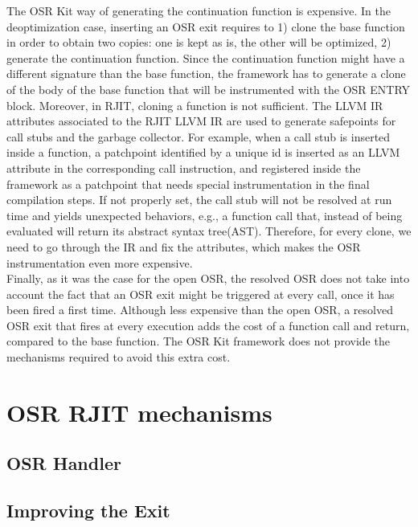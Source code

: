 The OSR Kit way of generating the continuation function is expensive.
In the deoptimization case, inserting an OSR exit requires to 1) clone the base function in order to obtain two copies: one is kept as is, the other will be optimized, 2) generate the continuation function. 
Since the continuation function might have a different signature than the base function, the framework has to generate a clone of the body of the base function that will be instrumented with the OSR ENTRY block.
Moreover, in RJIT, cloning a function is not sufficient.
The LLVM IR attributes\cite{llvmAttribute} associated to the RJIT LLVM IR are used to generate safepoints for call stubs and the garbage collector.
For example, when a call stub is inserted inside a function, a patchpoint identified by a unique id is inserted as an LLVM attribute in the corresponding call instruction, and registered inside the framework as a patchpoint that needs special instrumentation in the final compilation steps.
If not properly set, the call stub will not be resolved at run time and yields unexpected behaviors, e.g., a function call that, instead of being evaluated will return its abstract syntax tree(AST).
Therefore, for every clone, we need to go through the IR and fix the attributes, which makes the OSR instrumentation even more expensive.\\

Finally, as it was the case for the open OSR, the resolved OSR does not take into account the fact that an OSR exit might be triggered at every call, once it has been fired a first time.
Although less expensive than the open OSR, a resolved OSR exit that fires at every execution adds the cost of a function call and return, compared to the base function.
The OSR Kit framework does not provide the mechanisms required to avoid this extra cost.\\

\section{OSR RJIT mechanisms}
\subsection{OSR Handler}
\subsection{Improving the Exit}
    
